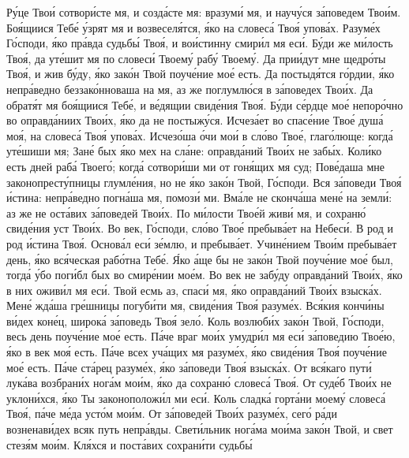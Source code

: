 \begin{mymulticols}

Р\'{у}це Тво\'{и} сотвор\'{и}сте мя, и созд\'{а}сте мя: вразум\'{и} мя, и науч\'{у}ся з\'{а}поведем Тво\'{и}м. Бо\'{я}щиися Теб\'{е} \'{у}зрят мя и возвесел\'{я}тся, \'{я}ко на словес\'{а} Тво\'{я} упов\'{а}х. Разум\'{е}х Г\'{о}споди, \'{я}ко пр\'{а}вда судьб\'{ы} Тво\'{я}, и во\'{и}стинну смир\'{и}л мя ес\'{и}. Б\'{у}ди же м\'{и}лость Тво\'{я}, да ут\'{е}шит мя по словес\'{и} Твоем\'{у} раб\'{у} Твоем\'{у}. Да при\'{и}дут мне щедр\'{о}ты Тво\'{я}, и жив б\'{у}ду, \'{я}ко зак\'{о}н Твой поуч\'{е}ние мо\'{е} есть. Да постыд\'{я}тся г\'{о}рдии, \'{я}ко непр\'{а}ведно беззак\'{о}нноваша на мя, аз же поглумл\'{ю}ся в з\'{а}поведех Тво\'{и}х. Да обрат\'{я}т мя бо\'{я}щиися Теб\'{е}, и в\'{е}дящии свид\'{е}ния Тво\'{я}. Б\'{у}ди с\'{е}рдце мо\'{е} непор\'{о}чно во оправд\'{а}ниих Тво\'{и}х, \'{я}ко да не постыж\'{у}ся. Исчез\'{а}ет во спас\'{е}ние Тво\'{е} душ\'{а} мо\'{я}, на словес\'{а} Тво\'{я} упов\'{а}х. Исчез\'{о}ша \'{о}чи мо\'{и} в сл\'{о}во Тво\'{е}, глаг\'{о}люще: когд\'{а} ут\'{е}шиши мя; Зан\'{е} бых \'{я}ко мех на сл\'{а}не: оправд\'{а}ний Тво\'{и}х не заб\'{ы}х. Кол\'{и}ко есть дней раб\'{а} Твоег\'{о}; когд\'{а} сотвор\'{и}ши ми от гон\'{я}щих мя суд; Пов\'{е}даша мне законопрест\'{у}пницы глумл\'{е}ния, но не \'{я}ко зак\'{о}н Твой, Г\'{о}споди. Вся з\'{а}поведи Тво\'{я} \'{и}стина: непр\'{а}ведно погн\'{а}ша мя, помоз\'{и} ми. Вм\'{а}ле не сконч\'{а}ша мен\'{е} на земл\'{и}: аз же не ост\'{а}вих з\'{а}поведей Тво\'{и}х. По м\'{и}лости Тво\'{е}й жив\'{и} мя, и сохран\'{ю} свид\'{е}ния уст Тво\'{и}х. Во век, Г\'{о}споди, сл\'{о}во Тво\'{е} пребыв\'{а}ет на Небес\'{и}. В род и род \'{и}стина Тво\'{я}. Основ\'{а}л ес\'{и} з\'{е}млю, и пребыв\'{а}ет. Учин\'{е}нием Тво\'{и}м пребыв\'{а}ет день, \'{я}ко вс\'{я}ческая раб\'{о}тна Теб\'{е}. \'{Я}ко \'{а}ще бы не зак\'{о}н Твой поуч\'{е}ние мо\'{е} был, тогд\'{а} \'{у}бо пог\'{и}бл бых во смир\'{е}нии мо\'{е}м. Во век не заб\'{у}ду оправд\'{а}ний Тво\'{и}х, \'{я}ко в них ожив\'{и}л мя ес\'{и}. Твой есмь аз, спас\'{и} мя, \'{я}ко оправд\'{а}ний Тво\'{и}х взыск\'{а}х. Мен\'{е} жд\'{а}ша гр\'{е}шницы погуб\'{и}ти мя, свид\'{е}ния Тво\'{я} разум\'{е}х. Вс\'{я}кия конч\'{и}ны в\'{и}дех кон\'{е}ц, широк\'{а} з\'{а}поведь Тво\'{я} зел\'{о}. Коль возлюб\'{и}х зак\'{о}н Твой, Г\'{о}споди, весь день поуч\'{е}ние мо\'{е} есть. П\'{а}че враг мо\'{и}х умудр\'{и}л мя ес\'{и} з\'{а}поведию Тво\'{е}ю, \'{я}ко в век мо\'{я} есть. П\'{а}че всех уч\'{а}щих мя разум\'{е}х, \'{я}ко свид\'{е}ния Тво\'{я} поуч\'{е}ние мо\'{е} есть. П\'{а}че ст\'{а}рец разум\'{е}х, \'{я}ко з\'{а}поведи Тво\'{я} взыск\'{а}х. От вс\'{я}каго пут\'{и} лук\'{а}ва возбран\'{и}х ног\'{а}м мо\'{и}м, \'{я}ко да сохран\'{ю} словес\'{а} Тво\'{я}. От суд\'{е}б Тво\'{и}х не уклон\'{и}хся, \'{я}ко Ты законополож\'{и}л ми ес\'{и}. Коль сладк\'{а} горт\'{а}ни моем\'{у} словес\'{а} Тво\'{я}, п\'{а}че м\'{е}да уст\'{о}м мо\'{и}м. От з\'{а}поведей Тво\'{и}х разум\'{е}х, сег\'{о} р\'{а}ди возненав\'{и}дех всяк путь непр\'{а}вды. Свет\'{и}льник ног\'{а}ма мо\'{и}ма зак\'{о}н Твой, и свет стез\'{я}м мо\'{и}м. Кл\'{я}хся и пост\'{а}вих сохран\'{и}ти судьб\'{ы} 
\end{mymulticols}
